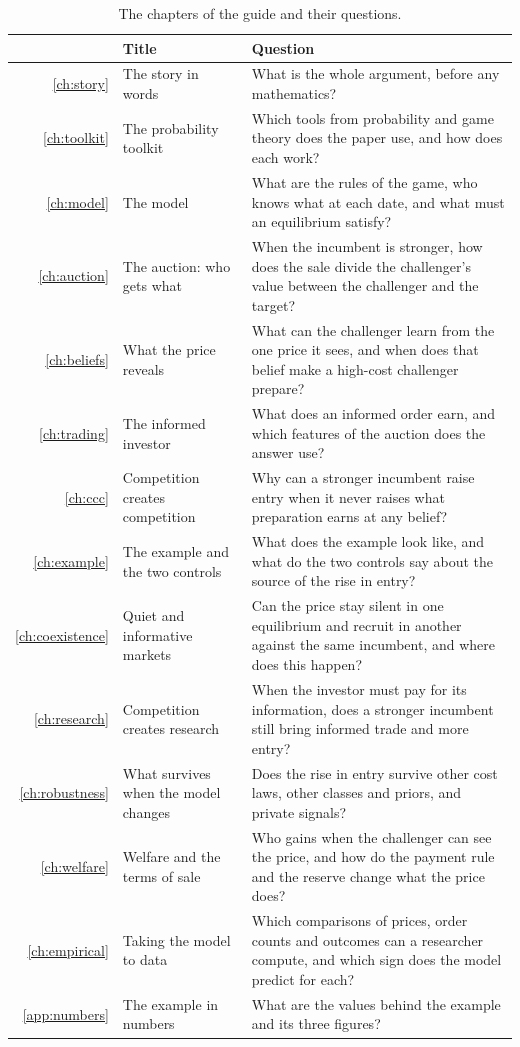 \begin{table}[t]
\centering\small
\caption{The chapters of the guide and their questions.}\label{tab:story-map}
\begin{tabular}{@{}r>{\raggedright\arraybackslash}p{4.0cm}>{\raggedright\arraybackslash}p{9.8cm}@{}}
\toprule
 & Title & Question\\
\midrule
\ref{ch:story} & The story in words & What is the whole argument, before any mathematics?\\[2pt]
\ref{ch:toolkit} & The probability toolkit & Which tools from probability and game theory does the paper use, and how does each work?\\[2pt]
\ref{ch:model} & The model & What are the rules of the game, who knows what at each date, and what must an equilibrium satisfy?\\[2pt]
\ref{ch:auction} & The auction: who gets what & When the incumbent is stronger, how does the sale divide the challenger's value between the challenger and the target?\\[2pt]
\ref{ch:beliefs} & What the price reveals & What can the challenger learn from the one price it sees, and when does that belief make a high-cost challenger prepare?\\[2pt]
\ref{ch:trading} & The informed investor & What does an informed order earn, and which features of the auction does the answer use?\\[2pt]
\ref{ch:ccc} & Competition creates competition & Why can a stronger incumbent raise entry when it never raises what preparation earns at any belief?\\[2pt]
\ref{ch:example} & The example and the two controls & What does the example look like, and what do the two controls say about the source of the rise in entry?\\[2pt]
\ref{ch:coexistence} & Quiet and informative markets & Can the price stay silent in one equilibrium and recruit in another against the same incumbent, and where does this happen?\\[2pt]
\ref{ch:research} & Competition creates research & When the investor must pay for its information, does a stronger incumbent still bring informed trade and more entry?\\[2pt]
\ref{ch:robustness} & What survives when the model changes & Does the rise in entry survive other cost laws, other classes and priors, and private signals?\\[2pt]
\ref{ch:welfare} & Welfare and the terms of sale & Who gains when the challenger can see the price, and how do the payment rule and the reserve change what the price does?\\[2pt]
\ref{ch:empirical} & Taking the model to data & Which comparisons of prices, order counts and outcomes can a researcher compute, and which sign does the model predict for each?\\[2pt]
\ref{app:numbers} & The example in numbers & What are the values behind the example and its three figures?\\
\bottomrule
\end{tabular}
\end{table}

